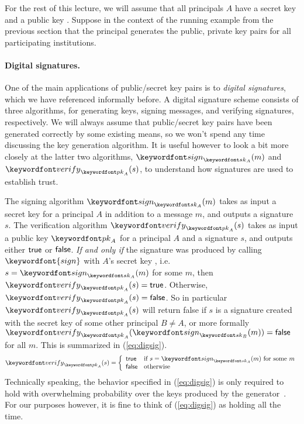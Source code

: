 \documentclass[11pt,twoside]{scrartcl}
\begin{document}
For the rest of this lecture, we will assume that all principals $A$ have a secret key  and a public key . Suppose in the context of the running example from the previous section that the \eduroam principal generates the public, private key pairs for all participating institutions. 

\paragraph{Digital signatures.} One of the main applications of public/secret key pairs is to \emph{digital signatures}, which we have referenced informally before. A digital signature scheme consists of three algorithms, for generating keys, signing messages, and verifying signatures, respectively. We will always assume that public/secret key pairs have been generated correctly by some existing means, so we won't spend any time discussing the key generation algorithm. It is useful however to look a bit more closely at the latter two algorithms, $\sign{\sk{A}}{m}$ and $\verify{\pk{A}}{s}$, to understand how signatures are used to establish trust.

The signing algorithm $\sign{\sk{A}}{m}$ takes as input a secret key  for a principal $A$ in addition to a message $m$, and outputs a signature $s$. The verification algorithm $\verify{\pk{A}}{s}$ takes as input a public key $\pk{A}$ for a principal $A$ and a signature $s$, and outputs either $\mathsf{true}$ or $\mathsf{false}$. \emph{If and only if} the signature was produced by calling $\keywordfont{sign}$ with $A$'s secret key , i.e. $s = \sign{\sk{A}}{m}$ for some $m$, then $\verify{\pk{A}}{s} = \strue$. Otherwise, $\verify{\pk{A}}{s} = \sfalse$. So in particular $\verify{\pk{A}}{s}$ will return false if $s$ is a signature created with the secret key of some other principal $B \ne A$, or more formally $\verify{\pk{A}}{\sign{\sk{B}}{m}} = \sfalse$ for all $m$. This is summarized in (\ref{eq:digsig}).
\begin{equation}
\label{eq:digsig}
\verify{\pk{A}}{s} =
\left\{
\begin{array}{ll}
\strue & \text{if}~s = \sign{\sk{A}}{m}~\text{for some}~m \\
\sfalse & \text{otherwise}
\end{array}
\right.
\end{equation}
Technically speaking, the behavior specified in (\ref{eq:digsig}) is only required to hold with overwhelming probability over the keys produced by the generator~\cite{Katz2014}. For our purposes however, it is fine to think of (\ref{eq:digsig}) as holding all the time.
\end{document}
